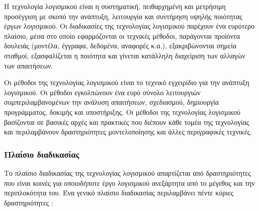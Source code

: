 Η τεχνολογία λογισμικού είναι η συστηματική, πειθαρχημένη και μετρήσιμη προσέγγιση με σκοπό την ανάπτυξη, λειτουργία και συντήρηση υψηλής ποιότητας έργων λογισμικού. Οι διαδικασίες της τεχνολογίας λογισμικού παρέχουν ένα ευρύτερο πλαίσιο, μέσα στο οποίο εφαρμόζονται οι τεχνικές μέθοδοι, παράγονται προϊόντα δουλειάς (μοντέλα, έγγραφα, δεδομένα, αναφορές κ.α.), εξακριβώνονται σημεία σταθμοί, εξασφαλίζεται η ποιότητα και γίνεται κατάλληλη διαχείριση των αλλαγών των απαιτήσεων.

Οι μέθοδοι της τεχνολογίας λογισμικού είναι το τεχνικό εγχειρίδιο για την ανάπτυξη λογισμικού. Οι μέθοδοι εγκολπώνουν ένα ευρύ σύνολο λειτουργιών συμπεριλαμβανομένων την ανάλυση απαιτήσεων, σχεδιασμού, δημιουργία προγράμματος, δοκιμής και υποστήριξης. Οι μέθοδοι της τεχνολογίας λογισμικού βασίζονται σε βασικές αρχές και πρακτικές που διέπουν κάθε τομέα της τεχνολογίας και περιλαμβάνουν δραστηριότητες μοντελοποίησης και άλλες περιγραφικές τεχνικές.

\subsubsection{Πλαίσιο διαδικασίας}

Το πλαίσιο διαδικασίας της τεχνολογίας λογισμικού απαρτίζεται από δραστηριότητες που είναι κοινές για οποιοδήποτε έργο λογισμικού ανεξάρτητα από το μέγεθος και την περιπλοκότητα του. Ένα γενικό πλαίσιο διαδικασίας περιλαμβάνει πέντε κύριες δραστηριότητες \cite{software_engineering_practiotioner_approach}:


